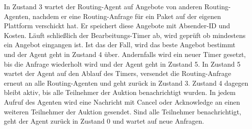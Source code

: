 In Zustand 3 wartet der Routing-Agent auf Angebote von anderen Routing-Agenten, nachdem er eine Routing-Anfrage für ein Paket auf der eigenen Plattform verschickt hat. Er speichert diese Angebote mit Absender-ID und Kosten. Läuft schließlich der Bearbeitungs-Timer ab, wird geprüft ob mindestens ein Angebot eingangen ist. Ist das der Fall, wird das beste Angebot bestimmt und der Agent geht in Zustand 4 über. Andernfalls wird ein neuer Timer gesetzt, bis die Anfrage wiederholt wird und der Agent geht in Zustand 5. In Zustand 5 wartet der Agent auf den Ablauf des Timers, versendet die Routing-Anfrage erneut an alle Routing-Agenten und geht zurück in Zustand 3. Zustand 4 dagegen bleibt aktiv, bis alle Teilnehmer der Auktion benachrichtigt wurden. In jedem Aufruf des Agenten wird eine Nachricht mit Cancel oder Acknowledge an einen weiteren Teilnehmer der Auktion gesendet. Sind alle Teilnehmer benachrichtigt, geht der Agent zurück in Zustand 0 und wartet auf neue Anfragen.